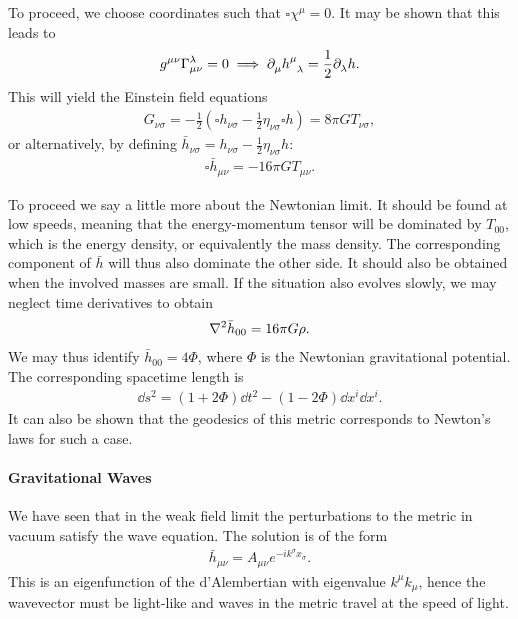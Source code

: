 To proceed, we choose coordinates such that $\square\chi^{\mu} = 0$. It may be shown that this leads to
\begin{align*}
	g^{\mu\nu}\chris{\lambda}{\mu}{\nu} = 0 \implies \del{\mu}{\tensor{h}{^{\mu}_{\lambda}}} = \frac{1}{2}\del{\lambda}{h}.
\end{align*}
This will yield the Einstein field equations
\begin{align*}
	G_{\nu\sigma} = -\frac{1}{2}(\square h_{\nu\sigma} - \frac{1}{2}\eta_{\nu\sigma}\square h) = 8\pi GT_{\nu\sigma},
\end{align*}
or alternatively, by defining $\bar{h}_{\nu\sigma} = h_{\nu\sigma} - \frac{1}{2}\eta_{\nu\sigma}h$:
\begin{align*}
	\square\bar{h}_{\mu\nu} = -16\pi GT_{\mu\nu}.
\end{align*}

To proceed we say a little more about the Newtonian limit. It should be found at low speeds, meaning that the energy-momentum tensor will be dominated by $T_{00}$, which is the energy density, or equivalently the mass density. The corresponding component of $\bar{h}$ will thus also dominate the other side. It should also be obtained when the involved masses are small. If the situation also evolves slowly, we may neglect time derivatives to obtain
\begin{align*}
	\laplacian{\bar{h}_{00}} = 16\pi G\rho.
\end{align*}
We may thus identify $\bar{h}_{00} = 4\Phi$, where $\Phi$ is the Newtonian gravitational potential. The corresponding spacetime length is
\begin{align*}
	\dd{s}^{2} = (1 + 2\Phi)\dd{t}^{2} - (1 - 2\Phi)\dd{x^{i}}\dd{x^{i}}.
\end{align*}
It can also be shown that the geodesics of this metric corresponds to Newton's laws for such a case.

\paragraph{Gravitational Waves}
We have seen that in the weak field limit the perturbations to the metric in vacuum satisfy the wave equation. The solution is of the form
\begin{align*}
	\bar{h}_{\mu\nu} = A_{\mu\nu}e^{-ik^{\sigma}x_{\sigma}}.
\end{align*}
This is an eigenfunction of the d'Alembertian with eigenvalue $k^{\mu}k_{\mu}$, hence the wavevector must be light-like and waves in the metric travel at the speed of light.

